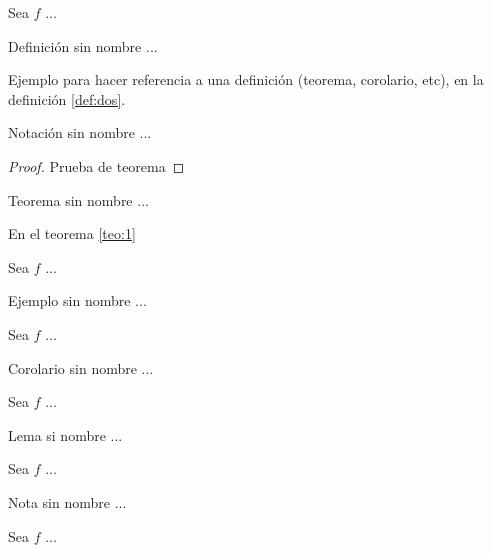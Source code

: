 \documentclass[fleqn]{Paquetes/RevDigMatEduInt}
\begin{document}
\begin{definicion}
	Sea $f$ ...
\end{definicion}

\begin{definicion}
Definición sin nombre ...
\end{definicion}

Ejemplo para hacer referencia a una definición (teorema, corolario, etc), en la definición \ref{def:dos}.

\begin{notacion}
	Notación sin nombre ...
\end{notacion}



\begin{proof}
	Prueba de teorema
\end{proof}

\begin{teorema}
Teorema sin nombre ...
\end{teorema}

En el teorema \ref{teo:1}

\begin{ejemplo}
	Sea $f$ ...
\end{ejemplo}

\begin{ejemplo}
	Ejemplo sin nombre ...
\end{ejemplo}

\begin{corolario}
	Sea $f$ ...
\end{corolario}

\begin{corolario}
Corolario sin nombre ...
\end{corolario}

\begin{lema}
Sea $f$ ...
\end{lema}

\begin{lema}
Lema si nombre ...
\end{lema}

\begin{nota}
Sea $f$ ...
\end{nota}

\begin{nota}
Nota sin nombre ...
\end{nota}

\begin{vocabulario}
Sea $f$ ...
\end{vocabulario}
\end{document}
